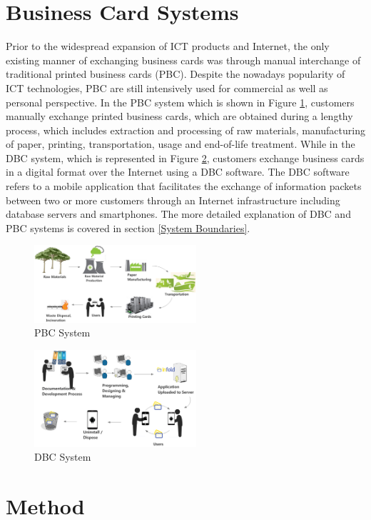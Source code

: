 \documentclass[conference]{IEEEtran}
\begin{document}
\section{Business Card Systems}

Prior to the widespread expansion of ICT products and Internet, the only existing manner of exchanging business cards was through manual interchange of traditional printed business cards (PBC). Despite the nowadays popularity of ICT technologies, PBC are still intensively used for commercial as well as personal perspective. In the PBC system which is shown in Figure \ref{PBCSystem}, customers manually exchange printed business cards, which are obtained during a lengthy process, which includes extraction and processing of raw materials, manufacturing of paper, printing, transportation, usage and end-of-life treatment. While in the DBC system, which is represented in Figure \ref{DBCSystem}, customers exchange business cards in a digital format over the Internet using a DBC software. The DBC software refers to a mobile application that facilitates the exchange of information packets between two or more customers through an Internet infrastructure including database servers and smartphones. The more detailed explanation of DBC and PBC systems is covered in section \ref{System Boundaries}.

\begin{figure}[h]
\centering
\includegraphics[width=6cm]{PBCSystem1.png}
\caption{PBC System}
\label{PBCSystem}
\end{figure}


\begin{figure}[h]
\centering
\includegraphics[width=6cm]{DBCSystem.png}
\caption{DBC System}
\label{DBCSystem}
\end{figure}


\section{Method}
\end{document}
